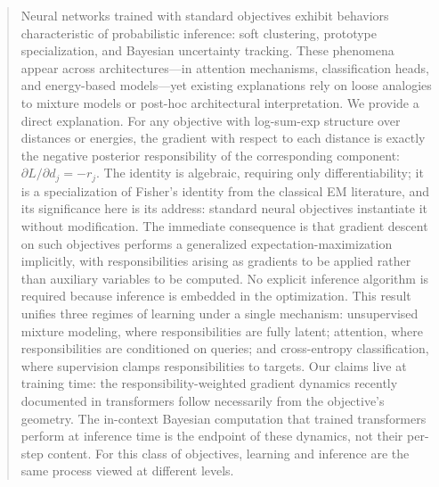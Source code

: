 \begin{abstract}

Neural networks trained with standard objectives exhibit behaviors characteristic of probabilistic inference: soft clustering, prototype specialization, and Bayesian uncertainty tracking. These phenomena appear across architectures---in attention mechanisms, classification heads, and energy-based models---yet existing explanations rely on loose analogies to mixture models or post-hoc architectural interpretation. We provide a direct explanation. For any objective with log-sum-exp structure over distances or energies, the gradient with respect to each distance is exactly the negative posterior responsibility of the corresponding component: $\partial L / \partial d_j = -r_j$. The identity is algebraic, requiring only differentiability; it is a specialization of Fisher's identity from the classical EM literature, and its significance here is its address: standard neural objectives instantiate it without modification. The immediate consequence is that gradient descent on such objectives performs a generalized expectation-maximization implicitly, with responsibilities arising as gradients to be applied rather than auxiliary variables to be computed. No explicit inference algorithm is required because inference is embedded in the optimization. This result unifies three regimes of learning under a single mechanism: unsupervised mixture modeling, where responsibilities are fully latent; attention, where responsibilities are conditioned on queries; and cross-entropy classification, where supervision clamps responsibilities to targets. Our claims live at training time: the responsibility-weighted gradient dynamics recently documented in transformers follow necessarily from the objective's geometry. The in-context Bayesian computation that trained transformers perform at inference time is the endpoint of these dynamics, not their per-step content. For this class of objectives, learning and inference are the same process viewed at different levels.

\end{abstract}

